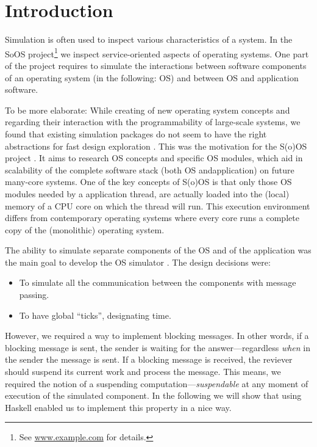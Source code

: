 \section{Introduction}

Simulation is often used to inspect various characteristics of a system.
In the SoOS project\footnote{See \url{www.example.com} for details.} we inspect service-oriented aspects of operating systems.
One part of the project requires to simulate the interactions between software components of an operating system (in the following: OS) and between
OS and application software.

To be more elaborate: While creating of new operating system concepts
and regarding their interaction with the programmability of large-scale systems, we found that existing simulation packages do not seem to have the right abstractions for fast design exploration \cite{cotson,omnet}.
This was the motivation for the S(o)OS project \cite{soos}.
It aims to research OS concepts and specific OS modules, which aid in scalability of the complete software stack (both OS andapplication) on future many-core systems.
One of the key concepts of S(o)OS is that only those OS modules needed by a application thread, are actually loaded into the (local) memory of a CPU core on which the thread will run.
This execution environment differs from contemporary operating systems where every core runs a complete copy of the (monolithic) operating system.

The ability to simulate separate components of the OS and of the application was the main goal to develop the OS simulator \soosim {}.
The design decisions were:
\begin{itemize}
\item To simulate all the communication between the components with message passing.
\item To have global ``ticks'', designating time.
\end{itemize}
However, we required a way to implement blocking messages.
In other words, if a blocking message is sent, the sender is waiting for the answer---regardless \emph{when} in the sender the message is sent.
If a blocking message is received, the reviever should suspend its current work and process the message.
This means, we required the notion of a suspending computation---\emph{suspendable} at any moment of execution of the simulated component.
In the following we will show that using Haskell \cite{haskell-report} enabled us to implement this property in a nice way.

